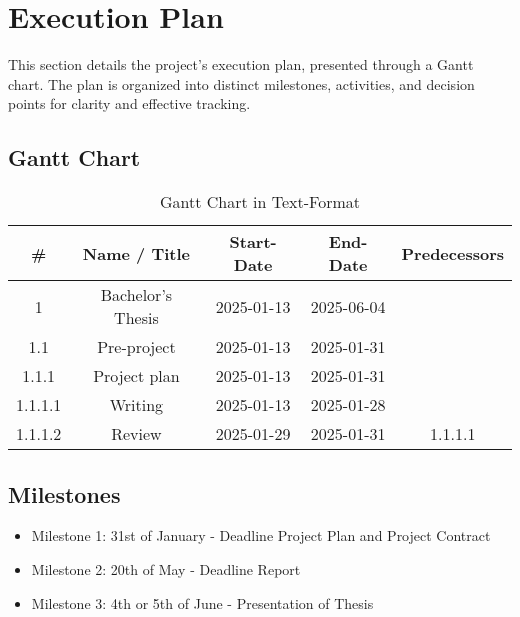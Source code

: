 \section{Execution Plan}

This section details the project's execution plan, presented through a Gantt chart. The plan is organized into distinct milestones, activities, and decision points for clarity and effective tracking.

\subsection{Gantt Chart}
\begin{comment}
    1. Terraform for OpenStack
    2. Docker
    3. Evt. Database

    https://app.teamgantt.com/projects/gantt?ids=4177546
\end{comment}

\begin{table}[H]
    \centering
    \begin{tabular}{|c|c|c|c|c|}
    \hline
    \# & Name / Title & Start-Date & End-Date & Predecessors \\
    \hline
    1 & Bachelor's Thesis & 2025-01-13 & 2025-06-04 & \\
    \hline
    1.1 & Pre-project & 2025-01-13 & 2025-01-31 & \\
    \hline
    1.1.1 & Project plan & 2025-01-13 & 2025-01-31 & \\
    \hline
    1.1.1.1 & Writing & 2025-01-13 & 2025-01-28 & \\
    \hline
    1.1.1.2 & Review & 2025-01-29 & 2025-01-31 & 1.1.1.1 \\
    \hline
    \end{tabular}
    \caption{Gantt Chart in Text-Format}
    \label{tab:gantt_text}
\end{table}



\subsection{Milestones}
\begin{itemize}
    \item Milestone 1: 31st of January - Deadline Project Plan and Project Contract
    \item Milestone 2: 20th of May - Deadline Report
    \item Milestone 3: 4th or 5th of June - Presentation of Thesis
\end{itemize}
\begin{comment}
    kanskje ha en egen deadline/goal om MVP etter et par sprints
    kan gjøre user testing med en MVP
    ish midten av mars
\end{comment}

